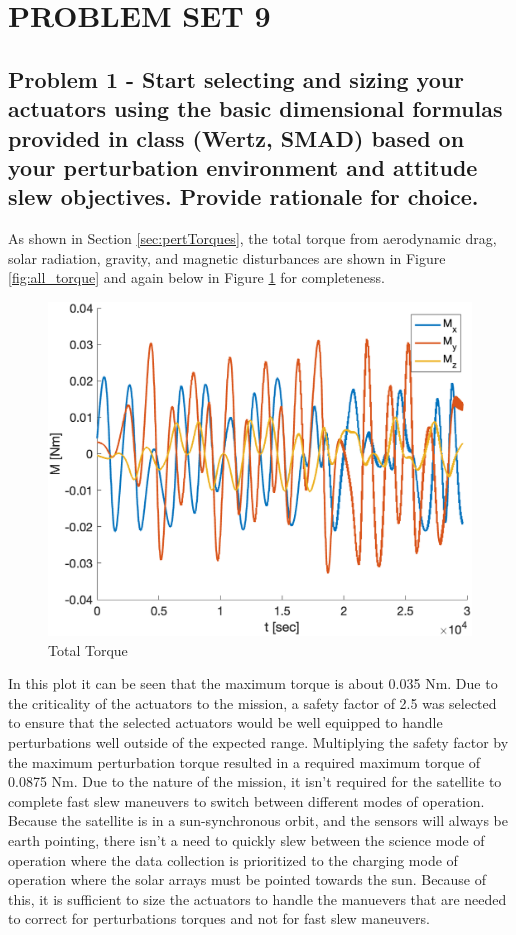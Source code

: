 \section{\Large PROBLEM SET 9}

\subsection{Problem 1 - Start selecting and sizing your actuators using the basic dimensional formulas provided in class (Wertz, SMAD) based on your perturbation environment and attitude slew objectives. Provide rationale for choice.}

As shown in Section \ref{sec:pertTorques}, the total torque from aerodynamic drag, solar radiation, gravity, and magnetic disturbances are shown in Figure \ref{fig:all_torque} and again below in Figure \ref{fig:all_torque_hw9} for completeness.

\begin{figure}[H]
    \centering
    \captionsetup{ justification = centering }
    \includegraphics[width = 12cm]{Images/PS6/all_torque.png}
    \caption{Total Torque}
    \label{fig:all_torque_hw9}
\end{figure}

In this plot it can be seen that the maximum torque is about 0.035 Nm. Due to the criticality of the actuators to the mission, a safety factor of 2.5 was selected to ensure that the selected actuators would be well equipped to handle perturbations well outside of the expected range. Multiplying the safety factor by the maximum perturbation torque resulted in a required maximum torque of 0.0875 Nm. Due to the nature of the mission, it isn't required for the satellite to complete fast slew maneuvers to switch between different modes of operation. Because the satellite is in a sun-synchronous orbit, and the sensors will always be earth pointing, there isn't a need to quickly slew between the science mode of operation where the data collection is prioritized to the charging mode of operation where the solar arrays must be pointed towards the sun. Because of this, it is sufficient to size the actuators to handle the manuevers that are needed to correct for perturbations torques and not for fast slew maneuvers.

